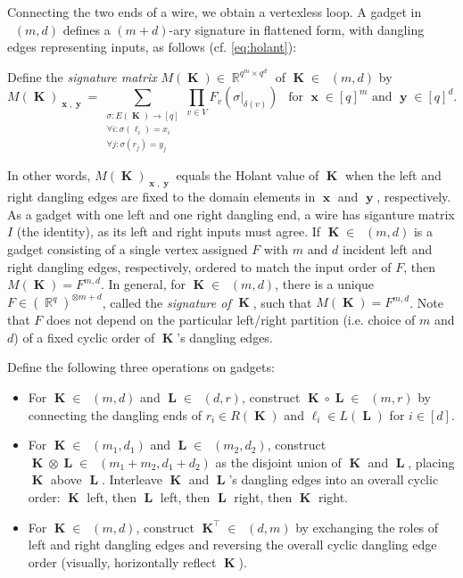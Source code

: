 \documentclass{theoretics}
\DeclareMathOperator{\rr}{\mathbb{R}}
\DeclareMathOperator{\vk}{\mathbf{K}}
\DeclareMathOperator{\vl}{\mathbf{L}}
\DeclareMathOperator{\vx}{\mathbf{x}}
\DeclareMathOperator{\vy}{\mathbf{y}}
\DeclareMathOperator{\gk}{\mathfrak{G}_{\mathcal{F}}}
\begin{document}
Connecting the two ends of a wire, we obtain a vertexless loop.
A gadget in $\gk(m,d)$ defines a $(m+d)$-ary signature in flattened form, with dangling edges representing
inputs, as follows (cf. \eqref{eq:holant}):
\begin{definition}[$M(\vk)$]
    \label{def:gadget_sig_matrix}
    Define the \emph{signature matrix} $M(\vk) \in \rr^{q^m \times q^d}$ of $\vk \in \gk(m,d)$ by
    \[
        M(\vk)_{\vx,\vy} = \sum_{\substack{\sigma: E(\vk) \to [q]
        \\ \forall i: \sigma(\ell_i) = x_i 
        \\ \forall j: \sigma(r_j) = y_{j}}}
        \prod_{v \in V} F_v(\sigma|_{\delta(v)})
        ~~\text{ for $\vx \in [q]^m$ and $\vy \in [q]^d$}.
    \]
\end{definition}
In other words, $M(\vk)_{\vx,\vy}$ equals the Holant value of $\vk$ when the left and right dangling
edges are fixed to the domain elements in $\vx$ and $\vy$, respectively.
As a gadget with one left and one right dangling end, a wire
has siganture matrix $I$ (the identity), as its left and right inputs must agree.
If $\vk \in \gk(m,d)$ is a gadget consisting
of a single vertex assigned $F$ with $m$ and $d$ incident left and right dangling edges, 
respectively, ordered to match the input order of $F$, then $M(\vk) = F^{m,d}$.
In general, for $\vk \in \gk(m,d)$, there is a unique $F \in (\rr^q)^{\otimes m+d}$, called the \emph{signature of} $\vk$,
such that $M(\vk) = F^{m,d}$. Note that $F$ does not depend on the
particular left/right partition (i.e. choice of $m$ and $d$) of a fixed cyclic order 
of $\vk$'s dangling edges.
\begin{definition}[$\circ, \otimes, \top$]
    Define the following three operations on gadgets:
    \begin{itemize}
        \item For $\vk \in \gk(m,d)$ and $\vl \in \gk(d,r)$, construct $\vk \circ \vl \in \gk(m,r)$
            by connecting the dangling ends of $r_i \in R(\vk)$ and $\ell_i \in L(\vl)$ for $i \in [d]$.
        \item For $\vk \in \gk(m_1,d_1)$ and $\vl \in \gk(m_2,d_2)$, construct 
            $\vk \otimes \vl \in \gk(m_1+m_2,d_1+d_2)$ as the disjoint union of $\vk$ and $\vl$,
            placing $\vk$ above $\vl$. Interleave $\vk$ and $\vl$'s dangling edges into
            an overall cyclic order: $\vk$ left, then $\vl$ left, then $\vl$ right, then $\vk$ right.
        \item For $\vk \in \gk(m,d)$, construct $\vk^{\top} \in \gk(d,m)$ 
            by exchanging the roles of left and right dangling edges and reversing
            the overall cyclic dangling edge order (visually, horizontally reflect $\vk$).
    \end{itemize}
\end{definition}
\end{document}
